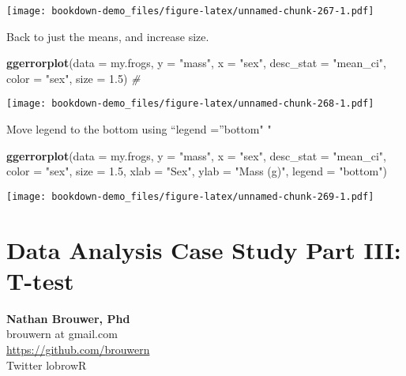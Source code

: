 \documentclass[]{book}
\newenvironment{Shaded}{\begin{snugshade}}{\end{snugshade}}
\newcommand{\KeywordTok}[1]{\textcolor[rgb]{0.13,0.29,0.53}{\textbf{#1}}}
\newcommand{\DataTypeTok}[1]{\textcolor[rgb]{0.13,0.29,0.53}{#1}}
\newcommand{\FloatTok}[1]{\textcolor[rgb]{0.00,0.00,0.81}{#1}}
\newcommand{\StringTok}[1]{\textcolor[rgb]{0.31,0.60,0.02}{#1}}
\newcommand{\CommentTok}[1]{\textcolor[rgb]{0.56,0.35,0.01}{\textit{#1}}}
\newcommand{\NormalTok}[1]{#1}
\theoremstyle{definition}
\theoremstyle{definition}
\theoremstyle{definition}
\theoremstyle{remark}
\begin{document}
\texttt{[image: bookdown-demo\_files/figure-latex/unnamed-chunk-267-1.pdf]}

Back to just the means, and increase size.

\begin{Shaded}
\begin{Highlighting}[]
\KeywordTok{ggerrorplot}\NormalTok{(}\DataTypeTok{data =}\NormalTok{ my.frogs,}
          \DataTypeTok{y =} \StringTok{"mass"}\NormalTok{,}
          \DataTypeTok{x =} \StringTok{"sex"}\NormalTok{,}
          \DataTypeTok{desc_stat =} \StringTok{"mean_ci"}\NormalTok{,}
          \DataTypeTok{color =} \StringTok{"sex"}\NormalTok{,}
          \DataTypeTok{size =} \FloatTok{1.5}\NormalTok{) }\CommentTok{#}
\end{Highlighting}
\end{Shaded}

\texttt{[image: bookdown-demo\_files/figure-latex/unnamed-chunk-268-1.pdf]}

Move legend to the bottom using ``legend =''bottom" "

\begin{Shaded}
\begin{Highlighting}[]
\KeywordTok{ggerrorplot}\NormalTok{(}\DataTypeTok{data =}\NormalTok{ my.frogs,}
          \DataTypeTok{y =} \StringTok{"mass"}\NormalTok{,}
          \DataTypeTok{x =} \StringTok{"sex"}\NormalTok{,}
          \DataTypeTok{desc_stat =} \StringTok{"mean_ci"}\NormalTok{,}
          \DataTypeTok{color =} \StringTok{"sex"}\NormalTok{,}
          \DataTypeTok{size =} \FloatTok{1.5}\NormalTok{,}
          \DataTypeTok{xlab =} \StringTok{"Sex"}\NormalTok{,}
          \DataTypeTok{ylab =} \StringTok{"Mass (g)"}\NormalTok{,}
          \DataTypeTok{legend =} \StringTok{"bottom"}\NormalTok{) }
\end{Highlighting}
\end{Shaded}

\texttt{[image: bookdown-demo\_files/figure-latex/unnamed-chunk-269-1.pdf]}

\chapter{Data Analysis Case Study Part III:
T-test}\label{data-analysis-case-study-part-iii-t-test}

\textbf{Nathan Brouwer, Phd}\\
brouwern at gmail.com\\
\url{https://github.com/brouwern}\\
Twitter lobrowR
\end{document}
